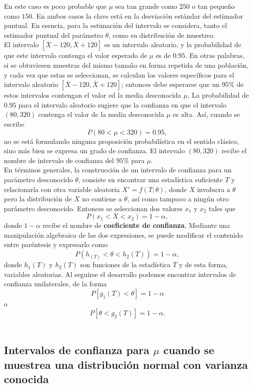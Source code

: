 En este caso es poco probable que $\mu$ sea tan grande como $250$ o tan pequeño como $150$. En ambos casos la clave está en la desviación estándar del estimador puntual. En esencia, para la estimación del intervalo se considera, tanto el estimador puntual del parámetro $\theta$, como su distribución de muestreo.\\

El intervalo $[\overline{X}-120,\overline{X}+120]$ es un intervalo aleatorio, y la probabilidad de que este intervalo contenga el valor esperado de $\mu$ es de $0.95$.  En otras palabras, si se obtuviesen muestras del mismo tamaño en forma repetida de una población, y cada vez que estas se seleccionan, se calculan los valores específicos para el intervalo aleatorio $[\overline{X}-120,\overline{X}+120]$; entonces debe esperarse que un $95\%$ de estos intervalos contengan el valor ed la media desconocida $\mu$. La probabilidad de $0.95$ para el intervalo aleatorio sugiere que la confianza en que el intervalo $(80,320)$ contenga el valor de la media desconocida $\mu$ es alta. Así, cuando se escribe
$$P(80<\mu<320)=0.95,$$
no se está formulando ninguna proposición probabilística en el sentido clásico, sino más bien se expresa un grado de confianza. El intervalo $(80,320)$ recibe el nombre de intervalo de confianza del $95\%$ para $\mu$.\\

En términos generales, la construcción de un intervalo de confianza para un parámetro desconocido $\theta$, consiste en encontrar una estadística suficiente $T$ y relacionarla con otra variable aleatoria $X'=f(T;\theta)$, donde $X$ involucra a $\theta$ pero la distribución de $X$ no contiene a $\theta$, así como tampoco a ningún otro parámetro desconocido. Entonces se seleccionan dos valores $x_1$ y $x_2$ tales que 
$$P(x_1<X<x_2)=1-\alpha,$$
donde $1-\alpha$ recibe el nombre de \textbf{coeficiente de confianza}. Mediante una manipulación algebraica de las dos expresiones, se puede modificar el contenido entre paréntesis y expresarlo como
$$P(h_(T)<\theta<h_2(T))=1-\alpha,$$
donde $h_1(T)$ y $h_2(T)$ son funciones de la estadística $T$ y de esta forma, variables aleatorias. Al seguirse el desarrollo podemos encontrar intervalos de confianza unilaterales, de la forma
$$P\left[g_1(T)<\theta\right]=1-\alpha$$
o
$$P\left[\theta<g_2(T)\right]=1-\alpha.$$\\


\subsection{Intervalos de confianza para \boldmath $\mu$ cuando se muestrea una distribución normal con varianza conocida}






